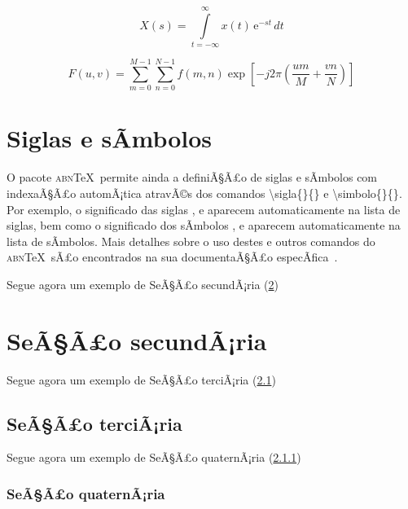 \documentclass[openright]{normas-utf-tex} %
\begin{document}
\begin{equation}
X(s) = \int\limits_{t = -\infty}^{\infty} x(t) \, \text{e}^{-st} \, dt
\label{eq:laplace}
\end{equation}

\begin{equation}
F(u, v) = \sum_{m = 0}^{M - 1} \sum_{n = 0}^{N - 1} f(m, n) \exp \left[ -j 2 \pi \left( \frac{u m}{M} + \frac{v n}{N} \right) \right]
\label{eq:dft}
\end{equation}

\section{Siglas e sÃ­mbolos}
\label{sec:siglasSimbolos}

O pacote \textsc{abn}\TeX\ permite ainda a definiÃ§Ã£o de siglas e sÃ­mbolos com indexaÃ§Ã£o automÃ¡tica atravÃ©s dos comandos {\ttfamily \textbackslash sigla\{\}\{\}} e {\ttfamily \textbackslash simbolo\{\}\{\}}. Por exemplo, o significado das siglas ,  e  aparecem automaticamente na lista de siglas, bem como o significado dos sÃ­mbolos ,  e  aparecem automaticamente na lista de sÃ­mbolos. Mais detalhes sobre o uso destes e outros comandos do \textsc{abn}\TeX\ sÃ£o encontrados na sua documentaÃ§Ã£o especÃ­fica~\cite{abnTeX2009}.

Segue agora um exemplo de SeÃ§Ã£o secundÃ¡ria (\ref{sec:secundaria})

\section{SeÃ§Ã£o secundÃ¡ria}
\label{sec:secundaria}

Segue agora um exemplo de SeÃ§Ã£o terciÃ¡ria (\ref{subsec:terciaria})

\subsection{SeÃ§Ã£o terciÃ¡ria}
\label{subsec:terciaria}

Segue agora um exemplo de SeÃ§Ã£o quaternÃ¡ria (\ref{subsubsec:quaternaria})

\subsubsection{SeÃ§Ã£o quaternÃ¡ria}
\label{subsubsec:quaternaria}
\end{document}
